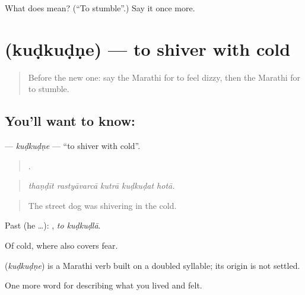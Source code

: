 \begin{tcolorbox}[breakable,colback=teal!4,colframe=teal!35!black,title={Before you move on}]
What does  mean? (\textquotedblleft{}To stumble\textquotedblright{}.) Say it once more.
\end{tcolorbox}
\section[\texorpdfstring{\mr{कुडकुडणे} (kuḍkuḍṇe)}{कुडकुडणे (kuḍkuḍṇe)}]{ (kuḍkuḍṇe) — to shiver with cold}

\label{lesson:MR-C493-kudkudne}



\begin{quote}
Before the new one: say the Marathi for to feel dizzy, then the Marathi for to stumble.
\end{quote}

\subsection*{You'll want to know: }
\textbf{} — \emph{kuḍkuḍṇe} — \textquotedblleft{}to shiver with cold\textquotedblright{}.

\begin{quote}
    .
\end{quote}

\begin{quote}
\emph{thaṇḍīt rastyāvarcā kutrā kuḍkuḍat hotā.}
\end{quote}

\begin{quote}
The street dog was shivering in the cold.
\end{quote}

Past (he …):  , \emph{to kuḍkuḍlā}.

Of cold, where  also covers fear.

\begin{cousinweb}
\textbf{} (\emph{kuḍkuḍṇe}) is a Marathi verb built on a doubled syllable; its origin is not settled.
\end{cousinweb}

\begin{grammarlens}[title={What you've built}]
One more word for describing what you lived and felt.
\end{grammarlens}

